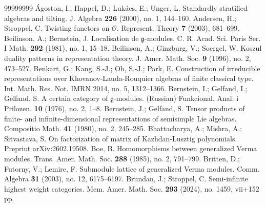 \documentclass[a4paper]{amsart}
\begin{document}
\begin{thebibliography}{99999999}
{\'A}goston, I.; Happel, D.; Luk{\'a}cs, E.; Unger, L.
Standardly stratified algebras and tilting.
J. Algebra {\bf 226} (2000), no. 1, 144--160.
 Andersen, H.; Stroppel, C. Twisting functors on 
$\mathcal{O}$. Represent. Theory {\bf 7} (2003), 681--699. 
 Beilinson, A.; Bernstein, J. 
Localisation de $\mathfrak{g}$-modules. 
C. R. Acad. Sci. Paris Ser. I Math. {\bf 292} (1981), no. 1, 15--18.
Beilinson, A.; Ginzburg, V.; Soergel, W.
Koszul duality patterns in representation theory. 
J. Amer. Math. Soc. {\bf 9} (1996), no. 2, 473--527. 
Benkart, G.; Kang, S.-J.; Oh, S.-J.; Park, E.
Construction of irreducible representations over 
Khovanov-Lauda-Rouquier algebras of finite classical type.
Int. Math. Res. Not. IMRN 2014, no. 5, 1312--1366.
 Bernstein, I.; Gelfand, I.; Gelfand, S. 
A certain category of $\mathfrak{g}$-modules. (Russian) Funkcional. Anal. i Prilozen. 
{\bf 10} (1976), no. 2, 1--8.
 Bernstein, J.; Gelfand, S. Tensor products of finite- and 
infinite-dimensional representations of semisimple Lie algebras. Compositio Math. 
{\bf 41} (1980), no. 2, 245--285.
Bhattacharya, A.; Mishra, A.; Srivastava, S.
On factorization of matrix of Kazhdan-Lusztig polynomials.
Preprint arXiv:2602.19508.
Boe, B. Homomorphisms between generalized Verma modules. 
Trans. Amer. Math. Soc. {\bf 288} (1985), no. 2, 791--799.
Britten, D.; Futorny, V.; Lemire, F. 
Submodule lattice of generalized Verma modules. 
Comm. Algebra {\bf 31} (2003), no. 12, 6175--6197.
Brundan, J.; Stroppel, C.
Semi-infinite highest weight categories.
Mem. Amer. Math. Soc. {\bf 293} (2024), no. 1459, vii+152 pp.

\end{thebibliography}
\end{document}
